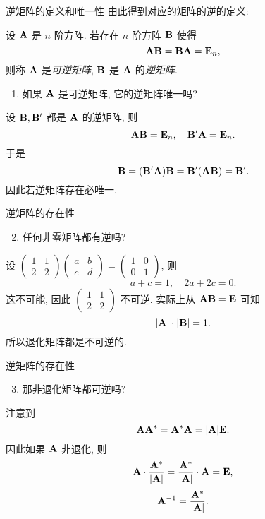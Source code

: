 \begin{frame}{逆矩阵的定义和唯一性}
	\onslide<+->
	由此得到对应的矩阵的逆的定义:
	\onslide<+->
	\begin{definition}
		设 ${\mathbf{A}}$ 是 $n$ 阶方阵. 若存在 $n$ 阶方阵 ${\mathbf{B}}$ 使得
		\[{\mathbf{A}}{\mathbf{B}}={\mathbf{B}}{\mathbf{A}}={\mathbf{E}}_n,\]
		则称 ${\mathbf{A}}$ 是\emph{可逆矩阵}, ${\mathbf{B}}$ 是 ${\mathbf{A}}$ 的\emph{逆矩阵}.
	\end{definition}
	\onslide<+->
	\begin{enumerate}
		\item 如果 ${\mathbf{A}}$ 是可逆矩阵, 它的逆矩阵唯一吗?
	\end{enumerate}
	\onslide<+->
	设 ${\mathbf{B}},{\mathbf{B}}'$ 都是 ${\mathbf{A}}$ 的逆矩阵, 则
	\[{\mathbf{A}}{\mathbf{B}}={\mathbf{E}}_n,\quad {\mathbf{B}}'{\mathbf{A}}={\mathbf{E}}_n.\]
	\onslide<+->
	于是
	\[{\mathbf{B}}=({\mathbf{B}}'{\mathbf{A}}){\mathbf{B}}={\mathbf{B}}'({\mathbf{A}}{\mathbf{B}})={\mathbf{B}}'.\]
	\onslide<+->
	因此若逆矩阵存在必唯一.
\end{frame}


\begin{frame}{逆矩阵的存在性}
	\onslide<+->
	\begin{enumerate}
		\setcounter{enumi}{1}
		\item 任何非零矩阵都有逆吗?
	\end{enumerate}
	\onslide<+->
	设 $\begin{pmatrix}
		1&1\\2&2
	\end{pmatrix}\begin{pmatrix}
		a&b\\c&d
	\end{pmatrix}=\begin{pmatrix}
		1&0\\0&1
	\end{pmatrix}$, 
	\onslide<+->
	则 
	\[a+c=1,\quad 2a+2c=0.\]
	\onslide<+->
	这不可能, 因此 $\begin{pmatrix}
		1&1\\2&2
	\end{pmatrix}$ 不可逆.
	\onslide<+->
	实际上从 ${\mathbf{A}}{\mathbf{B}}={\mathbf{E}}$ 可知
	\[|{\mathbf{A}}|\cdot|{\mathbf{B}}|=1.\]
	\onslide<+->
	所以退化矩阵都是不可逆的.
\end{frame}


\begin{frame}{逆矩阵的存在性}
	\onslide<+->
	\begin{enumerate}
		\setcounter{enumi}{2}
		\item 那非退化矩阵都可逆吗?
	\end{enumerate}
	\onslide<+->
	注意到
	\[{\mathbf{A}}{\mathbf{A}}^*={\mathbf{A}}^*{\mathbf{A}}=|{\mathbf{A}}|{\mathbf{E}}.\]
	\onslide<+->
	因此如果 ${\mathbf{A}}$ 非退化, 则
	\[{\mathbf{A}}\cdot\frac{{\mathbf{A}}^*}{|{\mathbf{A}}|}=\frac{{\mathbf{A}}^*}{|{\mathbf{A}}|}\cdot{\mathbf{A}}={\mathbf{E}},\]
	\onslide<+->
	\[{\mathbf{A}}^{-1}=\frac{{\mathbf{A}}^*}{|{\mathbf{A}}|}.\]
\end{frame}


